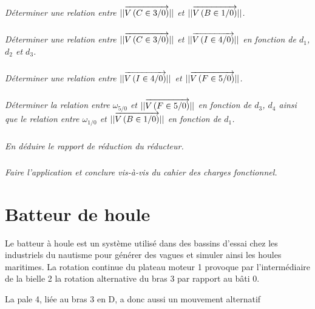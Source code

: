 \documentclass[10pt,fleqn]{article} %
\begin{document}
\subparagraph{}
\textit{Déterminer une relation entre $||\overrightarrow{V\left( {C} \in {3}/{0}\right)}||$ et $||\overrightarrow{V\left( {B} \in {1}/{0}\right)}||$.}

\subparagraph{}
\textit{Déterminer une relation entre $||\overrightarrow{V\left( {C} \in {3}/{0}\right)}||$ et $||\overrightarrow{V\left( {I} \in {4}/{0}\right)}||$ en fonction de $d_1$, $d_2$ et $d_3$.}

\subparagraph{}
\textit{Déterminer une relation entre $||\overrightarrow{V\left( {I} \in {4}/{0}\right)}||$ et $||\overrightarrow{V\left( {F} \in {5}/{0}\right)}||$.}

\subparagraph{}
\textit{Déterminer la relation entre $\omega_{5/0}$ et $||\overrightarrow{V\left( {F} \in {5}/{0}\right)}||$ en fonction de $d_3$, $d_4$ ainsi que le relation entre $\omega_{1/0}$ et $||\overrightarrow{V\left( {B} \in {1}/{0}\right)}||$ en fonction de $d_1$.}

\subparagraph{}
\textit{En déduire le rapport de réduction du réducteur.}

\subparagraph{}
\textit{Faire l'application et conclure vis-à-vis du cahier des charges fonctionnel.}


\begin{center}
\end{center}


\newpage

\section{Batteur de houle}
\setcounter{exo}{0}

Le batteur à houle est un système utilisé dans des bassins d’essai chez les industriels du nautisme pour 
générer des vagues et simuler ainsi les houles maritimes.
La rotation continue du plateau moteur 1 provoque par l'intermédiaire de la bielle 2 la rotation alternative du 
bras 3 par rapport au bâti 0.

La pale 4, liée au bras 3 en D, a donc aussi un mouvement alternatif
\end{document}
